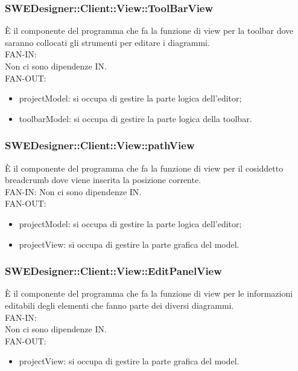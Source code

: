 \documentclass[../PianoDiQualifica.tex]{subfiles}
\begin{document}
		\subsubsection{SWEDesigner::Client::View::ToolBarView}
		È il componente del programma che fa la funzione di view per la toolbar dove saranno collocati gli strumenti per editare i diagrammi.\\
			FAN-IN:\\
			Non ci sono dipendenze IN.\\
			FAN-OUT:
			\begin{itemize}
				\item projectModel: si occupa di gestire la parte logica dell'editor;
				\item toolbarModel: si occupa di gestire la parte logica della toolbar.
			\end{itemize}

		\subsubsection{SWEDesigner::Client::View::pathView}
		È il componente del programma che fa la funzione di view per il cosiddetto breadcrumb dove viene inserita la posizione corrente.\\
		FAN-IN:
		Non ci sono dipendenze IN. \\
		FAN-OUT:
		\begin{itemize}
			\item projectModel: si occupa di gestire la parte logica dell'editor;
			\item projectView: si occupa di gestire la parte grafica del model.
		\end{itemize}
	
		\subsubsection{SWEDesigner::Client::View::EditPanelView}
		È il componente del programma che fa la funzione di view per le informazioni editabili degli elementi che fanno parte dei diversi diagrammi.\\
		FAN-IN:\\
		Non ci sono dipendenze IN. \\
		FAN-OUT:
		\begin{itemize}
			\item projectView: si occupa di gestire la parte grafica del model.
		\end{itemize}
	
\end{document}
